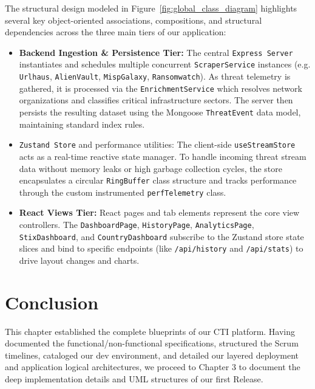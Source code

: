 The structural design modeled in Figure~\ref{fig:global_class_diagram} highlights several key object-oriented associations, compositions, and structural dependencies across the three main tiers of our application:
\begin{itemize}
    \item \textbf{Backend Ingestion \& Persistence Tier:} The central \texttt{Express Server} instantiates and schedules multiple concurrent \texttt{ScraperService} instances (e.g. \texttt{Urlhaus}, \texttt{AlienVault}, \texttt{MispGalaxy}, \texttt{Ransomwatch}). As threat telemetry is gathered, it is processed via the \texttt{EnrichmentService} which resolves network organizations and classifies critical infrastructure sectors. The server then persists the resulting dataset using the Mongoose \texttt{ThreatEvent} data model, maintaining standard index rules.
    \item \texttt{Zustand Store} and performance utilities: The client-side \texttt{useStreamStore} acts as a real-time reactive state manager. To handle incoming threat stream data without memory leaks or high garbage collection cycles, the store encapsulates a circular \texttt{RingBuffer} class structure and tracks performance through the custom instrumented \texttt{perfTelemetry} class.
    \item \textbf{React Views Tier:} React pages and tab elements represent the core view controllers. The \texttt{DashboardPage}, \texttt{HistoryPage}, \texttt{AnalyticsPage}, \texttt{StixDashboard}, and \texttt{CountryDashboard} subscribe to the Zustand store state slices and bind to specific endpoints (like \texttt{/api/history} and \texttt{/api/stats}) to drive layout changes and charts.
\end{itemize}

\section{Conclusion}
This chapter established the complete blueprints of our CTI platform. Having documented the functional/non-functional specifications, structured the Scrum timelines, cataloged our dev environment, and detailed our layered deployment and application logical architectures, we proceed to Chapter 3 to document the deep implementation details and UML structures of our first Release.
